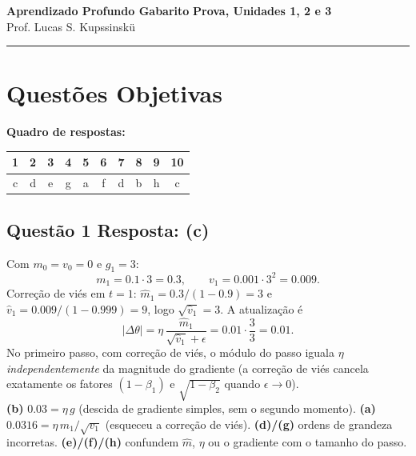 \documentclass[11pt,a4paper]{article}
\begin{document}
{\Large\bfseries Aprendizado Profundo \textemdash{} Gabarito} \hfill \textbf{Prova, Unidades 1, 2 e 3}\\
Prof. Lucas S. Kupssinskü

\rule{\linewidth}{0.8pt}

\section*{Questões Objetivas}

\textbf{Quadro de respostas:}
\begin{center}
\begin{tabular}{|c|c|c|c|c|c|c|c|c|c|}
\hline
1 & 2 & 3 & 4 & 5 & 6 & 7 & 8 & 9 & 10 \\\hline
c & d & e & g & a & f & d & b & h & c \\\hline
\end{tabular}
\end{center}

\color{blue}


\subsection*{Questão 1 \textemdash{} Resposta: (c)}
Com $m_0 = v_0 = 0$ e $g_1 = 3$:
\[
m_1 = 0.1\cdot 3 = 0.3, \qquad v_1 = 0.001\cdot 3^2 = 0.009.
\]
Correção de viés em $t = 1$: $\hat{m}_1 = 0.3/(1-0.9) = 3$ e $\hat{v}_1 = 0.009/(1-0.999) = 9$, logo $\sqrt{\hat{v}_1} = 3$. A atualização é
\[
|\Delta\theta| = \eta\,\frac{\hat{m}_1}{\sqrt{\hat{v}_1} + \epsilon} = 0.01\cdot\frac{3}{3} = 0.01.
\]
No primeiro passo, com correção de viés, o módulo do passo iguala $\eta$ \emph{independentemente} da magnitude do gradiente (a correção de viés cancela exatamente os fatores $(1-\beta_1)$ e $\sqrt{1-\beta_2}$ quando $\epsilon \to 0$).\\
\textbf{(b)} $0.03 = \eta\,g$ (descida de gradiente simples, sem o segundo momento).
\textbf{(a)} $0.0316 = \eta\,m_1/\sqrt{v_1}$ (esqueceu a correção de viés).
\textbf{(d)/(g)} ordens de grandeza incorretas.
\textbf{(e)/(f)/(h)} confundem $\hat{m}$, $\eta$ ou o gradiente com o tamanho do passo.
\end{document}

